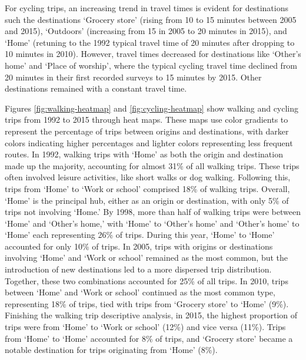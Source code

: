 \documentclass[preprint, 3p,
authoryear]{elsarticle} %
\begin{document}
For cycling trips, an increasing trend in travel times is evident for
destinations such the destinations `Grocery store' (rising from 10 to 15
minutes between 2005 and 2015), `Outdoors' (increasing from 15 in 2005
to 20 minutes in 2015), and `Home' (retuning to the 1992 typical travel
time of 20 minutes after dropping to 10 minutes in 2010). However,
travel times decreased for destinations like `Other's home' and `Place
of worship', where the typical cycling travel time declined from 20
minutes in their first recorded surveys to 15 minutes by 2015. Other
destinations remained with a constant travel time.

Figures \ref{fig:walking-heatmap} and \ref{fig:cycling-heatmap} show
walking and cycling trips from 1992 to 2015 through heat maps. These
maps use color gradients to represent the percentage of trips between
origins and destinations, with darker colors indicating higher
percentages and lighter colors representing less frequent routes. In
1992, walking trips with `Home' as both the origin and destination made
up the majority, accounting for almost 31\% of all walking trips. These
trips often involved leisure activities, like short walks or dog
walking. Following this, trips from `Home' to `Work or school' comprised
18\% of walking trips. Overall, `Home' is the principal hub, either as
an origin or destination, with only 5\% of trips not involving `Home.'
By 1998, more than half of walking trips were between `Home' and
`Other's home,' with `Home' to `Other's home' and `Other's home' to
`Home' each representing 26\% of trips. During this year, `Home' to
`Home' accounted for only 10\% of trips. In 2005, trips with origins or
destinations involving `Home' and `Work or school' remained as the most
common, but the introduction of new destinations led to a more dispersed
trip distribution. Together, these two combinations accounted for 25\%
of all trips. In 2010, trips between `Home' and `Work or school'
continued as the most common type, representing 18\% of trips, tied with
trips from `Grocery store' to `Home' (9\%). Finishing the walking trip
descriptive analysis, in 2015, the highest proportion of trips were from
`Home' to `Work or school' (12\%) and vice versa (11\%). Trips from
`Home' to `Home' accounted for 8\% of trips, and `Grocery store' became
a notable destination for trips originating from `Home' (8\%).
\end{document}
